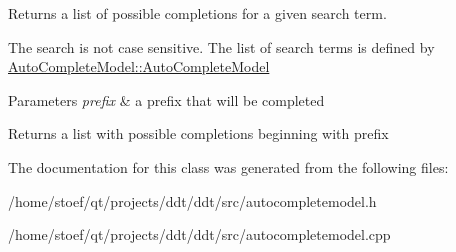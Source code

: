 Returns a list of possible completions for a given search term. 

The search is not case sensitive. The list of search terms is defined by \hyperlink{classAutoCompleteModel_ae7c8421f60a6602bf43e11199c69a130}{Auto\-Complete\-Model\-::\-Auto\-Complete\-Model} 
\begin{DoxyParams}{Parameters}
{\em prefix} & a prefix that will be completed \\
\hline
\end{DoxyParams}
\begin{DoxyReturn}{Returns}
a list with possible completions beginning with {\ttfamily prefix} 
\end{DoxyReturn}


The documentation for this class was generated from the following files\-:\begin{DoxyCompactItemize}
\item 
/home/stoef/qt/projects/ddt/ddt/src/autocompletemodel.\-h\item 
/home/stoef/qt/projects/ddt/ddt/src/autocompletemodel.\-cpp\end{DoxyCompactItemize}
